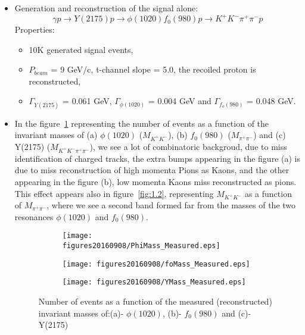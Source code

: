 \documentclass[a4paper]{article}
\begin{document}
\begin{itemize}
\item Generation and reconstruction of the signal alone:
  $${\gamma}p{\rightarrow}Y(2175)p{\rightarrow}{\phi}(1020)f_0(980)p{\rightarrow}K^+K^-\pi^+\pi^-p$$
  Properties:
  \begin{itemize}[label={--}]
  \item 10K generated signal events,
  \item $P_{beam}$ = 9 GeV/c, t-channel slope = 5.0, the recoiled proton is reconstructed,
  \item $\Gamma_{Y(2175)}$ = 0.061 GeV, $\Gamma_{\phi(1020)}$ = 0.004 GeV and $\Gamma_{f_o(980)}$ = 0.048 GeV.~\cite{ref:1}
  \end{itemize}
\item In the figure~\ref{fig:1.1} representing the number of events as a function of the invariant masses of (a) $\phi(1020)$ ($M_{K^+K^-}$), (b) $f_0(980)$ ($M_{\pi^+\pi^-}$) and (c) Y(2175) ($M_{K^+K^-\pi^+\pi^-}$), we see a lot of combinatoric backgroud, due to miss identification of charged tracks, the extra bumps appearing in the figure (a) is due to miss reconstruction of high momenta Pions as Kaons, and the other appearing in the figure (b), low momenta Kaons miss reconstructed as pions. This effect appears also in figure~\ref{fig:1.2}, representing $M_{K^+K^-}$ as a function of $M_{\pi^+\pi^-}$, where we see a second band formed far from the masses of the two resonances $\phi(1020)$ and $f_0(980)$.

  \begin{figure}[htbp]
    \centering
    \begin{subfigure}[b]{0.3\textwidth}
      \texttt{[image: figures20160908/PhiMass\_Measured.eps]}
      \caption{}
    \end{subfigure}
    \begin{subfigure}[b]{0.3\textwidth}
      \texttt{[image: figures20160908/foMass\_Measured.eps]}
      \caption{}
    \end{subfigure}
    \begin{subfigure}[b]{0.3\textwidth}
      \texttt{[image: figures20160908/YMass\_Measured.eps]}
      \caption{}
    \end{subfigure}
    \caption{Number of events as a function of the measured (reconstructed) invariant masses of:(a)- $\phi(1020)$, (b)- $f_0(980)$ and (c)- Y(2175)}
    \label{fig:1.1}
  \end{figure}


\end{itemize}
\end{document}
